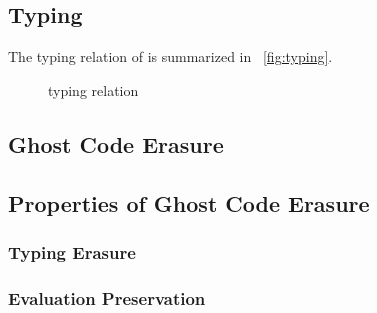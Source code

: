 \subsection{Typing}
The typing relation of \glam is summarized in ~\autoref{fig:typing}.
\begin{figure}[!h]
%	
	 \vspace*{0.4cm}
	
	\vspace*{0.4cm}
	
	\vspace*{0.4cm}
	
										{}\vspace*{0.4cm}
										
	{}
										
\caption{ \textbf{\glam  } typing relation \hfill}
\label{fig:typing}
\end{figure}

\subsection{Ghost Code Erasure}
\subsection{Properties of Ghost Code Erasure}
\subsubsection{Typing Erasure}
\subsubsection{Evaluation Preservation}